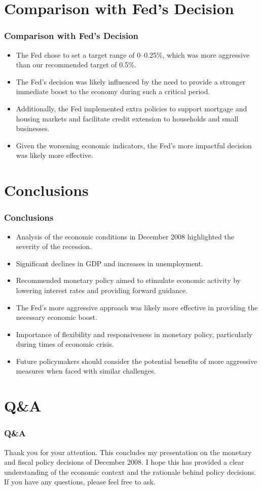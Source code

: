 \documentclass{beamer}
\begin{document}
\section{Comparison with Fed's Decision}
\begin{frame}
    \frametitle{Comparison with Fed's Decision}
    \begin{itemize}
        \item The Fed chose to set a target range of 0--0.25\%, which was more aggressive than our recommended target of 0.5\%.
        \item The Fed's decision was likely influenced by the need to provide a stronger immediate boost to the economy during such a critical period.
        \item Additionally, the Fed implemented extra policies to support mortgage and housing markets and facilitate credit extension to households and small businesses.
        \item Given the worsening economic indicators, the Fed's more impactful decision was likely more effective.
    \end{itemize}
\end{frame}

\section{Conclusions}
\begin{frame}
    \frametitle{Conclusions}
    \begin{itemize}
        \item Analysis of the economic conditions in December 2008 highlighted the severity of the recession.
        \item Significant declines in GDP and increases in unemployment.
        \item Recommended monetary policy aimed to stimulate economic activity by lowering interest rates and providing forward guidance.
        \item The Fed's more aggressive approach was likely more effective in providing the necessary economic boost.
        \item Importance of flexibility and responsiveness in monetary policy, particularly during times of economic crisis.
        \item Future policymakers should consider the potential benefits of more aggressive measures when faced with similar challenges.
    \end{itemize}
\end{frame}

\section{Q\&A}
\begin{frame}
    \frametitle{Q\&A}
    Thank you for your attention. This concludes my presentation on the monetary and fiscal policy decisions of December 2008. I hope this has provided a clear understanding of the economic context and the rationale behind policy decisions. If you have any questions, please feel free to ask.
\end{frame}
\end{document}
